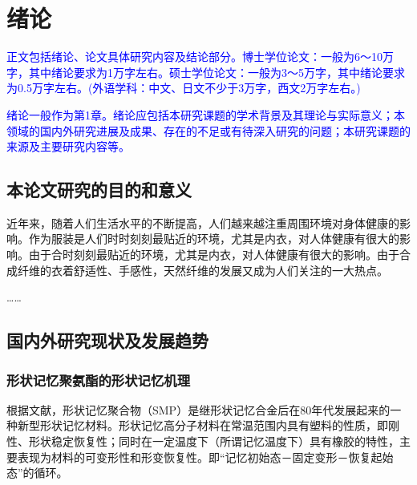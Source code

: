 %
%
%
%

\chapter{绪论}

\textcolor{blue}{
  正文包括绪论、论文具体研究内容及结论部分。博士学位论文：一般为6～10万字，其中绪论要求为1万字左右。硕士学位论文：一般为3～5万字，其中绪论要求为0.5万字左右。(外语学科：中文、日文不少于3万字，西文2万字左右。)
}

\textcolor{blue}{
  绪论一般作为第1章。绪论应包括本研究课题的学术背景及其理论与实际意义；本领域的国内外研究进展及成果、存在的不足或有待深入研究的问题；本研究课题的来源及主要研究内容等。
}


\label{chap:intro}
\section{本论文研究的目的和意义}

近年来，随着人们生活水平的不断提高，人们越来越注重周围环境对身体健康的影响。作为服装是人们时时刻刻最贴近的环境，尤其是内衣，对人体健康有很大的影响。由于合时刻刻最贴近的环境，尤其是内衣，对人体健康有很大的影响。由于合成纤维的衣着舒适性、手感性，天然纤维的发展又成为人们关注的一大热点。

……\cite{Takahashi1996Structure,Xia2002Analysis,Jiang1989,Mao2000Motion,Feng1998}

\section{国内外研究现状及发展趋势}

\subsection{形状记忆聚氨酯的形状记忆机理}

根据文献\parencite{Jiang2005Size}，形状记忆聚合物（SMP）是继形状记忆合金后在80年代发展起来的一种新型形状记忆材料。形状记忆高分子材料在常温范围内具有塑料的性质，即刚性、形状稳定恢复性；同时在一定温度下（所谓记忆温度下）具有橡胶的特性，主要表现为材料的可变形性和形变恢复性。即“记忆初始态－固定变形－恢复起始态”的循环。

